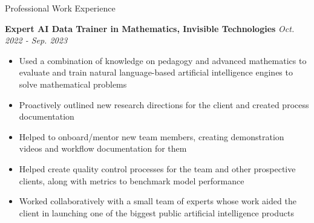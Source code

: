 \documentclass{resume} %
\begin{document}
\vspace{1em}

\begin{rSection}{Professional Work Experience}

{\bf{Expert AI Data Trainer in Mathematics, Invisible Technologies}}
\hfill\textit{{Oct. 2022 - Sep. 2023}}
\begin{itemize}
\item Used a combination of knowledge on pedagogy and advanced mathematics to evaluate and train natural language-based artificial intelligence engines to solve mathematical problems
\item Proactively outlined new research directions for the client and created process documentation
\item Helped to onboard/mentor new team members, creating demonstration videos and workflow documentation for them
\item Helped create quality control processes for the team and other prospective clients, along with metrics to benchmark model performance
\item Worked collaboratively with a small team of experts whose work aided the client in launching one of the biggest public artificial intelligence products
\end{itemize}

\end{rSection}

\vspace{1em}
\end{document}
